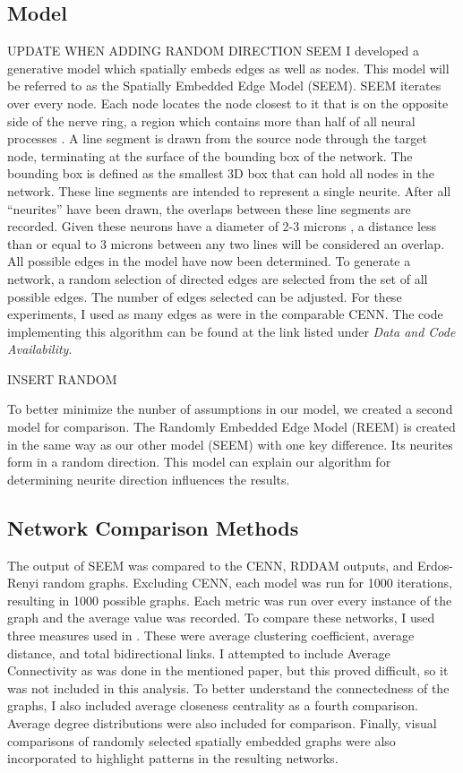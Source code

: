 \subsection{Model}
UPDATE WHEN ADDING RANDOM DIRECTION SEEM I developed a generative model which spatially embeds edges as well as nodes. 
This model will be referred to as the Spatially Embedded Edge Model (SEEM). 
SEEM iterates over every node. 
Each node locates the node closest to it that is on the opposite side of the nerve ring, a region which contains more than half of all neural processes \citep{Altun}. 
A line segment is drawn from the source node through the target node, terminating at the surface of the bounding box of the network. 
The bounding box is defined as the smallest 3D box that can hold all nodes in the network. 
These line segments are intended to represent a single neurite. 
After all “neurites” have been drawn, the overlaps between these line segments are recorded. 
Given these neurons have a diameter of 2-3 microns \citep{Schafer}, a distance less than or equal to 3 microns between any two lines will be considered an overlap. 
All possible edges in the model have now been determined. 
To generate a network, a random selection of directed edges are selected from the set of all possible edges. 
The number of edges selected can be adjusted. 
For these experiments, I used as many edges as were in the comparable CENN. 
The code implementing this algorithm can be found at the link listed under \textit{Data and Code Availability}.

INSERT RANDOM

To better minimize the nunber of assumptions in our model, we created a second model for comparison. 
The Randomly Embedded Edge Model (REEM) is created in the same way as our other model (SEEM) with one key difference. 
Its neurites form in a random direction. 
This model can explain our algorithm for determining neurite direction influences the results.

\subsection{Network Comparison Methods}
The output of SEEM was compared to the CENN, RDDAM outputs, and Erdos-Renyi random graphs. 
Excluding CENN, each model was run for 1000 iterations, resulting in 1000 possible graphs. 
Each metric was run over every instance of the graph and the average value was recorded. 
To compare these networks, I used three measures used in \cite{Itzhack}. 
These were average clustering coefficient, average distance, and total bidirectional links. 
I attempted to include Average Connectivity as was done in the mentioned paper, but this proved difficult, so it was not included in this analysis. 
To better understand the connectedness of the graphs, I also included average closeness centrality as a fourth comparison. 
Average degree distributions were also included for comparison. 
Finally, visual comparisons of randomly selected spatially embedded graphs were also incorporated to highlight patterns in the resulting networks.
